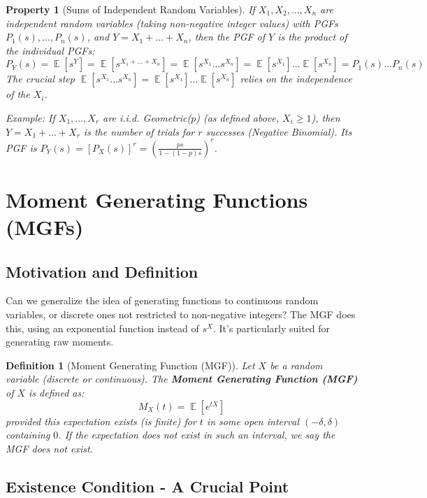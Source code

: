 \documentclass[11pt, letterpaper]{article}
\newtheorem{definition}[theorem]{Definition}
\newtheorem{property}[theorem]{Property}
\DeclareMathOperator{\E}{\mathbb{E}}
\begin{document}
\begin{property}[Sums of Independent Random Variables]
If $X_1, X_2, \dots, X_n$ are independent random variables (taking non-negative integer values) with PGFs $P_1(s), \dots, P_n(s)$, and $Y = X_1 + \dots + X_n$, then the PGF of $Y$ is the product of the individual PGFs:
\begin{equation}
    P_Y(s) = \E[s^Y] = \E[s^{X_1+\dots+X_n}] = \E[s^{X_1} \dots s^{X_n}] = \E[s^{X_1}]\dots\E[s^{X_n}] = P_1(s) \dots P_n(s)
\end{equation}
The crucial step $\E[s^{X_1} \dots s^{X_n}] = \E[s^{X_1}]\dots\E[s^{X_n}]$ relies on the independence of the $X_i$.

\emph{Example:} If $X_1, \dots, X_r$ are i.i.d. Geometric($p$) (as defined above, $X_i \ge 1$), then $Y = X_1 + \dots + X_r$ is the number of trials for $r$ successes (Negative Binomial). Its PGF is $P_Y(s) = [P_X(s)]^r = \left( \frac{ps}{1-(1-p)s} \right)^r$.
\end{property}

\section{Moment Generating Functions (MGFs)}

\subsection{Motivation and Definition}

Can we generalize the idea of generating functions to continuous random variables, or discrete ones not restricted to non-negative integers? The MGF does this, using an exponential function instead of $s^X$. It's particularly suited for generating raw moments.

\begin{definition}[Moment Generating Function (MGF)]
Let $X$ be a random variable (discrete or continuous). The \textbf{Moment Generating Function (MGF)} of $X$ is defined as:
\begin{equation}
    M_X(t) = \E[e^{tX}]
\end{equation}
provided this expectation exists (is finite) for $t$ in some open interval $(-\delta, \delta)$ containing $0$. If the expectation does not exist in such an interval, we say the MGF does not exist.
\end{definition}

\subsection{Existence Condition - A Crucial Point}
\end{document}
